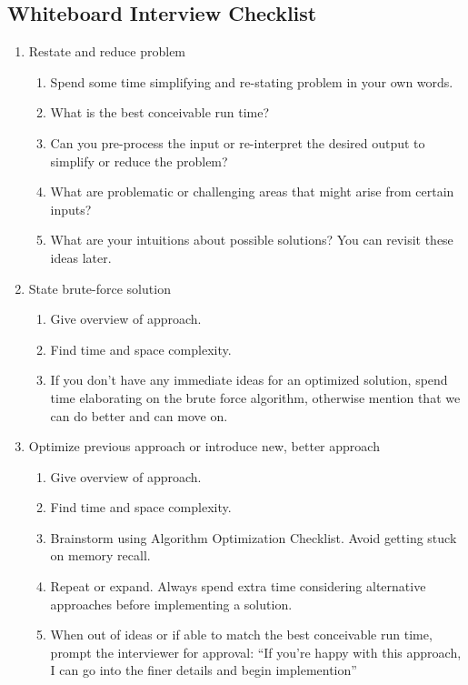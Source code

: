 \documentclass{article}
\begin{document}
\subsection{Whiteboard Interview Checklist}
\begin{enumerate}
    \item  Restate and reduce problem
    \begin{enumerate}
        \item Spend some time simplifying and re-stating problem in your own words.
        \item What is the best conceivable run time?
        \item Can you pre-process the input or re-interpret the desired output to simplify or reduce the problem?
        \item What are problematic or challenging areas that might arise from certain inputs?
        \item What are your intuitions about possible solutions? You can revisit these ideas later.
    \end{enumerate}
    
    \item State brute-force solution
    \begin{enumerate}
        \item Give overview of approach.
        \item Find time and space complexity.
        \item If you don't have any immediate ideas for an optimized solution, spend time elaborating on the brute force algorithm, otherwise mention that we can do better and can move on.
    \end{enumerate}
    
     \item Optimize previous approach or introduce new, better approach

    \begin{enumerate}
        \item Give overview of approach.
        \item Find time and space complexity.
        \item Brainstorm using Algorithm Optimization Checklist. Avoid getting stuck on memory recall.
        \item Repeat or expand. Always spend extra time considering alternative approaches before implementing a solution.
        \item When out of ideas or if able to match the best conceivable run time, prompt the interviewer for approval: ``If you're happy with this approach, I can go into the finer details and begin implemention''
    \end{enumerate}
    

\end{enumerate}
\end{document}
